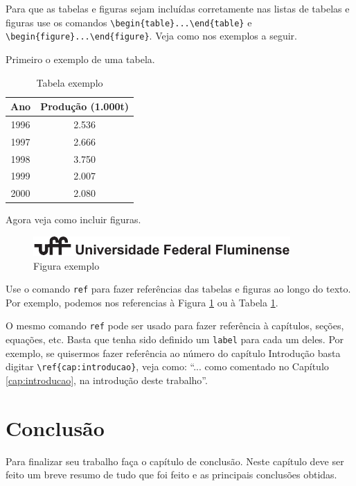 \documentclass[12pt,a4paper,header]{abnt}
\begin{document}
Para que as tabelas e figuras sejam incluídas corretamente nas listas de tabelas e figuras use os comandos 
\verb|\begin{table}...\end{table}| e \verb|\begin{figure}...\end{figure}|. Veja como nos exemplos a seguir.

Primeiro o exemplo de uma tabela. 

\begin{table}[h!]
\centering
\caption{Tabela exemplo} \label{fig:exemplo}
\begin{tabular}{cc}
\hline
Ano & Produção (1.000t)\\
\hline
1996 & 2.536\\
1997 & 2.666\\
1998 & 3.750\\
1999 & 2.007\\
2000 & 2.080\\
\hline
\end{tabular}
\end{table}

Agora veja como incluir figuras.

\begin{figure}[h!]
\centering
\includegraphics[width=0.5\linewidth]{logoUFF.pdf}
\caption{Figura exemplo} \label{tab:exemplo}
\end{figure}

Use o comando \verb|ref| para fazer referências das tabelas e figuras ao longo do texto. Por exemplo, podemos nos referencias à Figura \ref{fig:exemplo} ou à Tabela \ref{tab:exemplo}. 

O mesmo comando \verb|ref| pode ser usado para fazer referência à capítulos, seções, equações, etc. Basta que tenha sido definido um \verb|label| para cada um deles. Por exemplo, se quisermos fazer referência ao número do capítulo Introdução basta digitar \verb|\ref{cap:introducao}|, veja como: ``... como comentado no Capítulo \ref{cap:introducao}, na introdução deste trabalho''. 




\chapter{Conclusão}

Para finalizar seu trabalho faça o capítulo de conclusão. Neste capítulo deve ser feito um breve resumo de tudo que foi feito e as principais conclusões obtidas.
\end{document}
